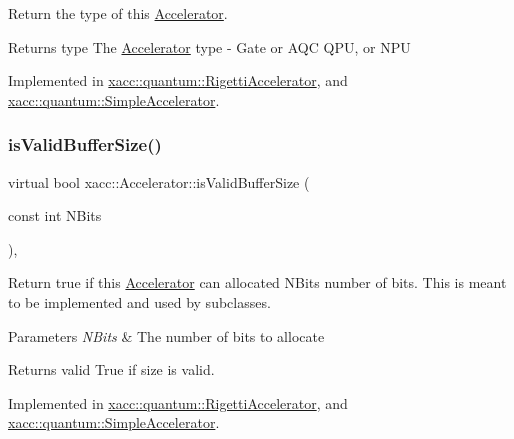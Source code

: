 Return the type of this \hyperlink{a01087}{Accelerator}.

\begin{DoxyReturn}{Returns}
type The \hyperlink{a01087}{Accelerator} type -\/ Gate or A\+QC Q\+PU, or N\+PU 
\end{DoxyReturn}


Implemented in \hyperlink{a00919_aab0d4674da5273d55407b9ab77cde890}{xacc\+::quantum\+::\+Rigetti\+Accelerator}, and \hyperlink{a00943_ad76eeb0bbd7de21aad5bd20d20970a98}{xacc\+::quantum\+::\+Simple\+Accelerator}.

\mbox{\label{a01087_ae51584850faeec77299058383977ddeb}} 
\subsubsection{\texorpdfstring{is\+Valid\+Buffer\+Size()}{isValidBufferSize()}}
{\footnotesize\ttfamily virtual bool xacc\+::\+Accelerator\+::is\+Valid\+Buffer\+Size (\begin{DoxyParamCaption}\item[{const int}]{N\+Bits }\end{DoxyParamCaption})\hspace{0.3cm}{\ttfamily [protected]}, {}}

Return true if this \hyperlink{a01087}{Accelerator} can allocated N\+Bits number of bits. This is meant to be implemented and used by subclasses.


\begin{DoxyParams}{Parameters}
{\em N\+Bits} & The number of bits to allocate \\
\hline
\end{DoxyParams}
\begin{DoxyReturn}{Returns}
valid True if size is valid. 
\end{DoxyReturn}


Implemented in \hyperlink{a00919_a61352c07062597aad2393fbeed4cc025}{xacc\+::quantum\+::\+Rigetti\+Accelerator}, and \hyperlink{a00943_a60b9db2d6aed235857c45413a070338e}{xacc\+::quantum\+::\+Simple\+Accelerator}.

\mbox{\label{a01087_ac3e781f42ec25e460174d4c41ea26b94}} 
